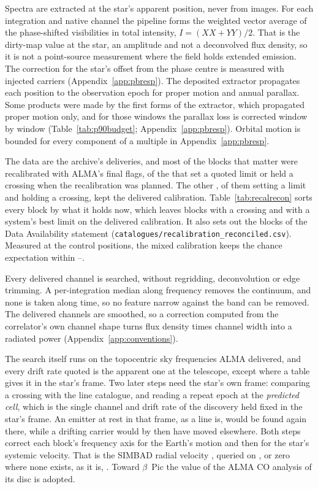 Spectra are extracted at the star's apparent position, never from images. For
each integration and native channel the pipeline forms the weighted vector
average of the phase-shifted visibilities in total intensity, $I=(XX+YY)/2$.
That is the dirty-map value at the star, an amplitude and not a deconvolved
flux density, so it is not a point-source measurement where the field holds
extended emission. The correction for the star's offset from the phase
centre is measured with injected carriers (Appendix~\ref{app:pbresp}).
The deposited extractor propagates each position to the observation epoch
for proper motion and annual parallax. Some products were made by the first
forms of the extractor, which propagated proper motion only, and for those
windows the parallax loss is corrected window by window
(Table~\ref{tab:p90budget}; Appendix~\ref{app:pbresp}).
Orbital motion is bounded for every component of a multiple in
Appendix~\ref{app:pbresp}.

The data are the archive's deliveries, and most of the blocks that matter
were recalibrated with ALMA's final flags, \RflNEbCore{} of the
\RflNEbCoreAll{} that set a quoted limit or held a crossing when the
recalibration was planned. The other \RflNEbNot{}, \RflNNotLim{} of them
setting a limit and \RflNNotCross{} holding a crossing, kept the delivered
calibration. Table~\ref{tab:recalrecon} sorts every block by what it holds
now, which leaves
\LrRecNCrossNotRec{} blocks with a crossing and \LrRecNBestNotRec{} with a
system's best limit on the delivered calibration. It also sets out the
\XgNBlkPlan{} blocks of the Data Availability statement
(\texttt{catalogues/\allowbreak recalibration\_reconciled.csv}). Measured at
the control positions, the mixed calibration keeps the chance expectation
within \RflCeLo--\RflCeHi.

Every delivered channel is searched, without regridding, deconvolution or
edge trimming. A per-integration median along frequency removes the
continuum, and none is taken along time, so no feature narrow against the
band can be removed. The delivered channels are smoothed, so a correction
computed from the correlator's own channel shape turns flux density times
channel width into a radiated power (Appendix~\ref{app:conventions}).

The search itself runs on the topocentric sky frequencies ALMA delivered, and
every drift rate quoted is the apparent one at the telescope, except where a
table gives it in the star's frame. Two later steps
need the star's own frame: comparing a crossing with the line catalogue, and
reading a repeat epoch at the \emph{predicted cell}, which is the single
channel and drift rate of the discovery held fixed in the star's frame. An
emitter at rest in that frame, as a line is, would be found again there,
while a drifting carrier would by then have moved elsewhere. Both steps
correct each block's frequency axis for the Earth's motion and then for the
star's systemic velocity. That is the SIMBAD radial velocity \citep{SIMBAD2000},
queried on \SimbadQueryDate, or zero where none exists, as it is,
\FrZeroVsysClause. Toward $\beta$~Pic the value of the ALMA CO analysis of
its disc \citep{Matra2017} is adopted.

